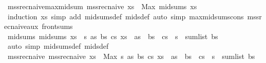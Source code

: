 \begin{isabellebody}
\endisatagproof
{\isafoldproof}%
%
\isadelimproof
\isanewline
%
\endisadelimproof
\isanewline
{}\isamarkupfalse%
\ mss{\isacharunderscore}{\kern0pt}rec{\isacharunderscore}{\kern0pt}naive{\isacharunderscore}{\kern0pt}max{\isacharunderscore}{\kern0pt}mid{\isacharunderscore}{\kern0pt}sum{\isacharcolon}{\kern0pt}\ {\isachardoublequoteopen}mss{\isacharunderscore}{\kern0pt}rec{\isacharunderscore}{\kern0pt}naive\ xs\ {\isacharequal}{\kern0pt}\ Max\ {\isacharparenleft}{\kern0pt}mid{\isacharunderscore}{\kern0pt}sums\ xs{\isacharparenright}{\kern0pt}{\isachardoublequoteclose}\isanewline
%
\isadelimproof
\ \ %
\endisadelimproof
%
\isatagproof
{}\isamarkupfalse%
\ {\isacharparenleft}{\kern0pt}induction\ xs{\isacharparenright}{\kern0pt}\ {\isacharparenleft}{\kern0pt}simp\ add{\isacharcolon}{\kern0pt}\ mid{\isacharunderscore}{\kern0pt}sums{\isacharunderscore}{\kern0pt}def\ mids{\isacharunderscore}{\kern0pt}def{\isacharcomma}{\kern0pt}\ auto\ simp{\isacharcolon}{\kern0pt}\ max{\isacharunderscore}{\kern0pt}mid{\isacharunderscore}{\kern0pt}sums{\isacharunderscore}{\kern0pt}cons\ mss{\isacharunderscore}{\kern0pt}rec{\isacharunderscore}{\kern0pt}naive{\isacharunderscore}{\kern0pt}aux\ front{\isacharunderscore}{\kern0pt}sums{\isacharparenright}{\kern0pt}%
\endisatagproof
{\isafoldproof}%
%
\isadelimproof
\isanewline
%
\endisadelimproof
\isanewline
{}\isamarkupfalse%
\ mid{\isacharunderscore}{\kern0pt}sums{\isacharcolon}{\kern0pt}\ {\isachardoublequoteopen}mid{\isacharunderscore}{\kern0pt}sums\ xs\ {\isacharequal}{\kern0pt}\ {\isacharbraceleft}{\kern0pt}s{\isachardot}{\kern0pt}\ {\isasymexists}as\ bs\ cs{\isachardot}{\kern0pt}\ xs\ {\isacharequal}{\kern0pt}\ as\ {\isacharat}{\kern0pt}\ bs\ {\isacharat}{\kern0pt}\ cs\ {\isasymand}\ s\ {\isacharequal}{\kern0pt}\ sum{\isacharunderscore}{\kern0pt}list\ bs{\isacharbraceright}{\kern0pt}{\isachardoublequoteclose}\isanewline
%
\isadelimproof
\ \ %
\endisadelimproof
%
\isatagproof
{}\isamarkupfalse%
\ {\isacharparenleft}{\kern0pt}auto\ simp{\isacharcolon}{\kern0pt}\ mid{\isacharunderscore}{\kern0pt}sums{\isacharunderscore}{\kern0pt}def\ mids{\isacharunderscore}{\kern0pt}def{\isacharparenright}{\kern0pt}%
\endisatagproof
{\isafoldproof}%
%
\isadelimproof
\isanewline
%
\endisadelimproof
\isanewline
{}\isamarkupfalse%
\ mss{\isacharunderscore}{\kern0pt}rec{\isacharunderscore}{\kern0pt}naive{\isacharcolon}{\kern0pt}\ {\isachardoublequoteopen}mss{\isacharunderscore}{\kern0pt}rec{\isacharunderscore}{\kern0pt}naive\ xs\ {\isacharequal}{\kern0pt}\ Max\ {\isacharbraceleft}{\kern0pt}s{\isachardot}{\kern0pt}\ {\isasymexists}as\ bs\ cs{\isachardot}{\kern0pt}\ xs\ {\isacharequal}{\kern0pt}\ as\ {\isacharat}{\kern0pt}\ bs\ {\isacharat}{\kern0pt}\ cs\ {\isasymand}\ s\ {\isacharequal}{\kern0pt}\ sum{\isacharunderscore}{\kern0pt}list\ bs{\isacharbraceright}{\kern0pt}{\isachardoublequoteclose}\isanewline

\end{isabellebody}
